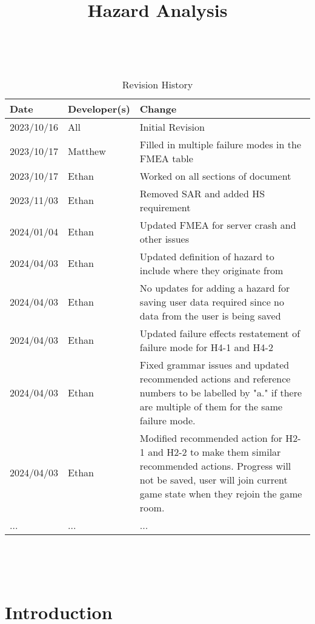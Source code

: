 \documentclass{article}
\title{Hazard Analysis\\\progname}
\author{\authname}
\date{}
\begin{document}
\maketitle
\thispagestyle{empty}

~\newpage


\begin{table}[hp]
\caption{Revision History} \label{TblRevisionHistory}
\begin{tabularx}{\textwidth}{llX}
\toprule
\textbf{Date} & \textbf{Developer(s)} & \textbf{Change}\\
\midrule
2023/10/16 & All & Initial Revision\\
2023/10/17 & Matthew & Filled in multiple failure modes in the FMEA table \\
2023/10/17 & Ethan & Worked on all sections of document \\
2023/11/03 & Ethan & Removed SAR and added HS requirement \\
2024/01/04 & Ethan & Updated FMEA for server crash and other issues\\
2024/04/03 & Ethan & Updated definition of hazard to include where they originate from\\
2024/04/03 & Ethan & No updates for adding a hazard for saving user data required since no data from the user is being saved\\
2024/04/03 & Ethan & Updated failure effects restatement of failure mode for H4-1 and H4-2\\
2024/04/03 & Ethan & Fixed grammar issues and updated recommended actions and reference numbers to be labelled by "a." if there are multiple of them for the same failure mode.\\
2024/04/03 & Ethan & Modified recommended action for H2-1 and H2-2 to make them similar recommended actions. Progress will not be saved, user will join current game state when they rejoin the game room. \\
... & ... & ...\\
\bottomrule
\end{tabularx}
\end{table}

~\newpage

\tableofcontents

~\newpage



\section{Introduction}
\end{document}
